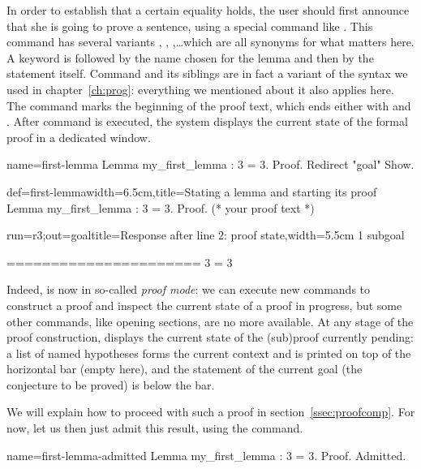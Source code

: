 In order to establish that a certain equality holds, the user should
first announce that she is going to prove a sentence, using a special
command like . This command has several variants ,
, ,\dots which are all synonyms for what
matters here.
A  keyword is followed by the name chosen for the lemma and
then by the statement itself. Command  and its siblings are in fact
a variant of the  syntax we used in
chapter~\ref{ch:prog}: everything we mentioned about it also applies
here. The  command marks the beginning of the proof text,
which ends either with  and . After command
 is executed, the system displays the current state of the
formal proof in a dedicated window.

\begin{coqdef}{name=first-lemma}
Lemma my_first_lemma : 3 = 3.
Proof. Redirect "goal" Show.
\end{coqdef}
\begin{coq}{def=first-lemma}{width=6.5cm,title=Stating a lemma and starting its proof}
Lemma my_first_lemma : 3 = 3.
Proof.
(* your proof text *)
$~$
\end{coq}
\begin{coqout}{run=r3;out=goal}{title=Response after line 2: proof state,width=5.5cm}
1 subgoal

  ======================
   3 = 3
\end{coqout}
Indeed, \Coq{} is now in so-called \emph{proof mode}: we can execute
new commands to construct a proof and inspect the current state of a
proof in progress, but some other commands, like opening sections, are
no more available. At any stage of the proof construction, \Coq{}
displays the current state of the (sub)proof currently pending:  a
list of named hypotheses forms the current context and is printed
on top of the horizontal bar (empty here), and
the statement of the current goal (the conjecture to be proved) is
below the bar.

We will explain how to proceed with such a proof in
section~\ref{ssec:proofcomp}.
For now, let us then just admit this result, using the 
command.

\begin{coq}{name=first-lemma-admitted}{}
Lemma my_first_lemma : 3 = 3.
Proof.
Admitted.
\end{coq}

